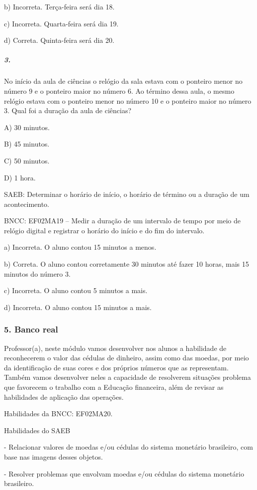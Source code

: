 b) Incorreta. Terça-feira será dia 18.

c) Incorreta. Quarta-feira será dia 19.

d) Correta. Quinta-feira será dia 20.

\subparagraph{3.}\label{section-56}

No início da aula de ciências o relógio da sala estava com o ponteiro
menor no número 9 e o ponteiro maior no número 6. Ao término dessa
aula, o mesmo relógio estava com o ponteiro menor no número
10 e o ponteiro maior no número 3. Qual foi a duração da aula de
ciências?

A) 30 minutos.

B) 45 minutos.

C) 50 minutos.

D) 1 hora.

SAEB: Determinar o horário de início, o horário de término ou a
duração de um acontecimento.

BNCC: EF02MA19 -- Medir a duração de um intervalo de tempo por meio de
relógio digital e registrar o horário do início e do fim do intervalo.

a) Incorreta. O aluno contou 15 minutos a menos.

b) Correta. O aluno contou corretamente 30 minutos até fazer 10 horas,
mais 15 minutos do número 3.

c) Incorreta. O aluno contou 5 minutos a mais.

d) Incorreta. O aluno contou 15 minutos a mais.

\subsubsection{5. Banco real }\label{muxf3dulo-5-banco-real}

Professor(a), neste módulo vamos desenvolver nos alunos a habilidade de
reconhecerem o valor das cédulas de dinheiro, assim como das moedas, por
meio da identificação de suas cores e dos próprios números que as
representam. Também vamos desenvolver neles a capacidade de
resolverem situações problema que favorecem o trabalho com a Educação financeira, além de revisar as habilidades de aplicação das
operações. 

Habilidades da BNCC: EF02MA20.

Habilidades do SAEB

- Relacionar valores de moedas e/ou cédulas do sistema monetário
brasileiro, com base nas imagens desses objetos.

- Resolver problemas que envolvam moedas e/ou cédulas do sistema
monetário brasileiro.


